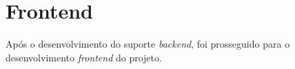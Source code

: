 \section{Frontend}
Após o desenvolvimento do suporte \textit{backend}, foi prosseguido para o desenvolvimento \textit{frontend} do projeto.




\newpage



\newpage







\newpage









\newpage

